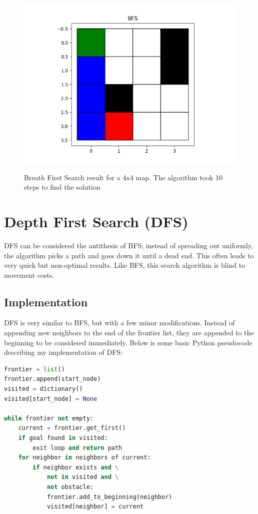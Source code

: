 \documentclass[journal]{IEEEtran}
\begin{document}
    \begin{figure}[ht]
        \includegraphics[width=\linewidth]{figures/BFS_SmallMap_Path.png}
        \label{fig:Dijkstra_Weights_Example}
        \caption{Breath First Search result for a 4x4 map. The algorithm took 10 steps to find the solution}
    \end{figure} 

    \section{Depth First Search (DFS)} \label{DFS}
    DFS can be considered the antithesis of BFS; instead of spreading out uniformly, the algorithm picks a path and goes down it until a dead end. This often leads to very quick but non-optimal results. Like BFS, this search algorithm is blind to movement costs.

    \subsection{Implementation}
    DFS is very similar to BFS, but with a few minor modifications. Instead of appending new neighbors to the end of the frontier list, they are appended to the beginning to be considered immediately. Below is some basic Python pseudocode describing my implementation of DFS:

    \begin{lstlisting}[language=Python]
frontier = list()
frontier.append(start_node)
visited = dictionary()
visited[start_node] = None

while frontier not empty:
    current = frontier.get_first()
    if goal found in visited:
        exit loop and return path
    for neighbor in neighbors of current:
        if neighbor exists and \
            not in visited and \
            not obstacle:
            frontier.add_to_beginning(neighbor)
            visited[neighbor] = current
    \end{lstlisting}
        
\end{document}
